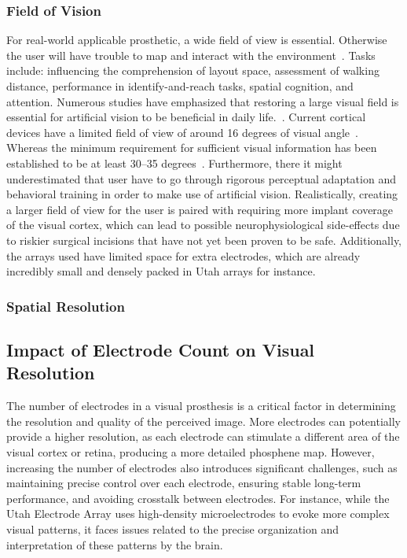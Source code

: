 \documentclass[twocolumn,10pt]{article}
\begin{document}
\subsubsection*{Field of Vision}
For real-world applicable prosthetic, a wide field of view is essential.
Otherwise the user will have trouble to map and interact with the
environment~\parencite{sugawaraRelationshipPeripheralVisual2010}. Tasks include:
influencing the comprehension of layout space, assessment of walking distance,
performance in identify-and-reach tasks, spatial cognition, and attention.
Numerous studies have emphasized that restoring a large visual field is
essential for artificial vision to be beneficial in daily
life.~\parencite{subhiFunctionalVisualFields2017,sugawaraRelationshipPeripheralVisual2010}.
Current cortical devices have a limited field of view of around 16 degrees of
visual angle~\parencite{vandergrintenBiologicallyPlausiblePhosphene2024}.
Whereas the minimum requirement for sufficient visual information has been
established to be at least 30--35
degrees~\parencite{sommerhalderProspectsLimitationsSpatial2017}. Furthermore,
there it might underestimated that user have to go through rigorous perceptual
adaptation and behavioral training in order to make use of artificial vision.
Realistically, creating a larger field of view for the user is paired with
requiring more implant coverage of the visual cortex, which can lead to possible
neurophysiological side-effects due to riskier surgical incisions that have not
yet been proven to be safe. Additionally, the arrays used have limited space for
extra electrodes, which are already incredibly small and densely packed in Utah
arrays for instance.

\subsubsection*{Spatial Resolution}


\subsection*{Impact of Electrode Count on Visual Resolution}
The number of electrodes in a visual prosthesis is a critical factor in determining the resolution and quality of the perceived image. More electrodes can potentially provide a higher resolution, as each electrode can stimulate a different area of the visual cortex or retina, producing a more detailed phosphene map. However, increasing the number of electrodes also introduces significant challenges, such as maintaining precise control over each electrode, ensuring stable long-term performance, and avoiding crosstalk between electrodes. For instance, while the Utah Electrode Array uses high-density microelectrodes to evoke more complex visual patterns, it faces issues related to the precise organization and interpretation of these patterns by the brain.
\end{document}
